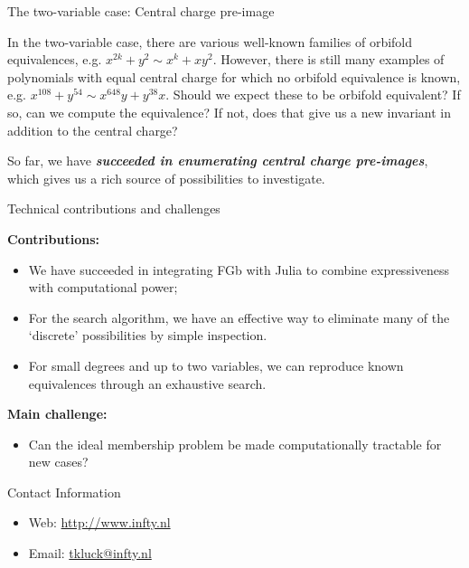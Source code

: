 \documentclass[final]{beamer}
\newlength{\onecolwid}
\begin{document}
\begin{frame}[t]
\begin{columns}[t]
\begin{column}{\onecolwid}
\begin{block}{The two-variable case: Central charge pre-image}

In the two-variable case, there are various well-known families of
orbifold equivalences, e.g. $x^{2k}+y^{2}\sim x^{k}+xy^{2}$. However,
there is still many examples of polynomials with equal central charge
for which no orbifold equivalence is known, e.g. $x^{108}+y^{54}\sim x^{648}y+y^{38}x$.
Should we expect these to be orbifold equivalent? If so, can we compute
the equivalence? If not, does that give us a new invariant in addition
to the central charge?

So far, we have \textbf{\emph{succeeded in enumerating central charge
pre-images}}, which gives us a rich source of possibilities\textbf{\emph{
}}to investigate.
\end{block}
%
\begin{block}{Technical contributions and challenges}

{\bf Contributions:}
\begin{itemize}
\item We have succeeded in integrating FGb with Julia to combine expressiveness
with computational power;
\item For the search algorithm, we have an effective way to eliminate many
of the `discrete' possibilities by simple inspection.
\item For small degrees and up to two variables, we can reproduce known equivalences
through an exhaustive search.
\end{itemize}
{\bf Main challenge:}
\begin{itemize}
\item Can the ideal membership problem be made computationally tractable for new cases?
\end{itemize}
\end{block}

\vspace{150mm}


\begin{alertblock}{Contact Information}

\begin{itemize}
\item Web: \href{http://www.infty.nl/}{http://www.infty.nl}
\item Email: \href{mailto:tkluck@infty.nl}{tkluck@infty.nl}
\end{itemize}


\end{alertblock}
\end{column}
\end{columns}
\end{frame}
\end{document}
